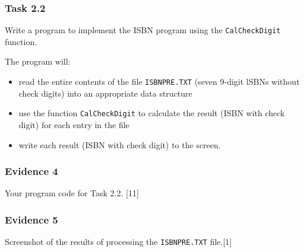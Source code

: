 \subsubsection*{Task 2.2}

Write a program to implement the ISBN program using the \texttt{CalCheckDigit}
function.

The program will:
\begin{itemize}
\item read the entire contents of the file \texttt{ISBNPRE.TXT} (seven 9-digit
lSBNs without check digits) into an appropriate data structure
\item use the function \texttt{CalCheckDigit} to calculate the result (ISBN
with check digit) for each entry in the file
\item write each result (ISBN with check digit) to the screen.
\end{itemize}

\subsubsection*{Evidence 4}

Your program code for Task 2.2. \hfill{}{[}11{]}

\subsubsection*{Evidence 5}

Screenshot of the results of processing the \texttt{ISBNPRE.TXT} file.\hfill{}{[}1{]}